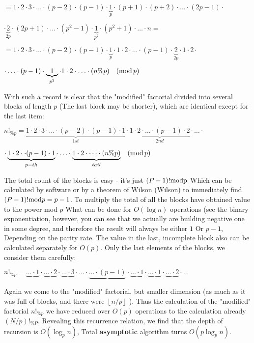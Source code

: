 $=1\cdot2\cdot3\cdot\ldots\cdot(p-2)\cdot(p-1)\cdot\underbrace{1}_{p}\cdot(p+1)\cdot(p+2)\cdot\ldots\cdot(2p-1)\cdot$

$\cdot\underbrace{2}_{2p}\cdot(2p+1)\cdot\ldots\cdot(p^{2}-1)\cdot\underbrace{1}_{p^{2}}\cdot(p^{2}+1)\cdot\ldots\cdot n=$

$=1\cdot2\cdot3\cdot\ldots\cdot(p-2)\cdot(p-1)\cdot\underbrace{1}_{p}\cdot1\cdot2\cdot\ldots\cdot(p-1)\cdot\underbrace{2}_{2p}\cdot1\cdot2\cdot$

$\cdot\ldots\cdot(p-1)\cdot\underbrace{1}_{p^{2}}\cdot1\cdot2\cdot\ldots\cdot(n\%p)\quad({\rm mod\,}p)$

With such a record is clear that the "modified" factorial divided into several blocks of length $p$ (The last block may be shorter), which are identical except for the last item:

$n!_{\%p}=\underbrace{1\cdot2\cdot3\cdot\ldots\cdot(p-2)\cdot(p-1)\cdot1}_{1st}\cdot\underbrace{1\cdot2\cdot\ldots\cdot(p-1)\cdot2}_{2nd}\cdot\ldots\cdot$

$\cdot\underbrace{1\cdot2\cdot\cdot(p-1)\cdot1}_{p-th}\cdot\ldots\cdot\underbrace{1\cdot2\cdot\dots\cdot(n\%p)}_{tail}\quad({\rm mod\,}p)$

The total count of the blocks is easy - it's just $(P-1)! \rm {mod} p$ Which can be calculated by software or by a theorem of Wilson (Wilson) to immediately find $(P-1)! {\rm mod} p = p-1$. To multiply the total of all the blocks have obtained value to the power mod $p$ What can be done for $O (\log n)$ operations (see the binary exponentiation, however, you can see that we actually are building negative one in some degree, and therefore the result will always be either $1$ Or $p-1$, Depending on the parity rate. The value in the last, incomplete block also can be calculated separately for $O (p)$. Only the last elements of the blocks, we consider them carefully:

$n!_{\%p}=\underbrace{\ldots\cdot1}\cdot\underbrace{\ldots\cdot2}\cdot\underbrace{\ldots\cdot3}\cdot\ldots\cdot\underbrace{\ldots\cdot(p-1)}\cdot\underbrace{\ldots\cdot1}\cdot\underbrace{\ldots\cdot1}\cdot\underbrace{\ldots\cdot2}\cdot\ldots$

Again we come to the "modified" factorial, but smaller dimension (as much as it was full of blocks, and there were $\left \lfloor n / p \right \rfloor$ ). Thus the calculation of the "modified" factorial $n! _ {\% p}$ we have reduced over $O (p)$ operations to the calculation already $(N / p)! _ {\% P}$. Revealing this recurrence relation, we find that the depth of recursion is $O (\log_p n)$, Total \textbf{asymptotic} algorithm turns $O (p \log_p n)$.

